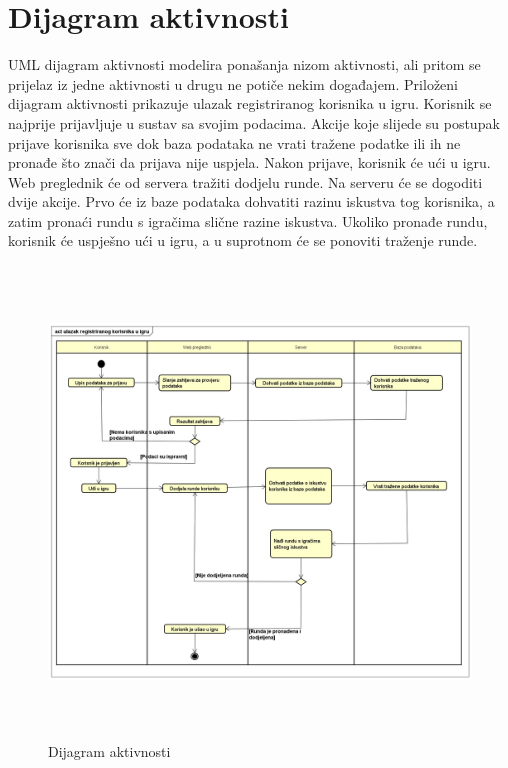 			\eject 
			
	
		\section{Dijagram aktivnosti}
		
			{UML dijagram aktivnosti modelira ponašanja nizom aktivnosti, ali pritom se prijelaz iz jedne aktivnosti u drugu ne potiče nekim događajem. Priloženi dijagram aktivnosti prikazuje ulazak registriranog korisnika u igru. Korisnik se najprije prijavljuje u sustav sa svojim podacima. Akcije koje slijede su postupak prijave korisnika sve dok baza podataka ne vrati tražene podatke ili ih ne pronađe što znači da prijava nije uspjela. Nakon prijave, korisnik će ući u igru. Web preglednik će od servera tražiti dodjelu runde. Na serveru će se dogoditi dvije akcije. Prvo će iz baze podataka dohvatiti razinu iskustva tog korisnika, a zatim pronaći rundu s igračima slične razine iskustva. Ukoliko pronađe rundu, korisnik će uspješno ući u igru, a u suprotnom će se ponoviti traženje runde.}
			 
			\begin{figure}[h]
			 	\centering
			 	\includegraphics[width=17.5cm,height=12.5cm]{activityDiagram}
			 	\caption{Dijagram aktivnosti}
			 	\label{fig:act}
			\end{figure}
			
			\eject
		
